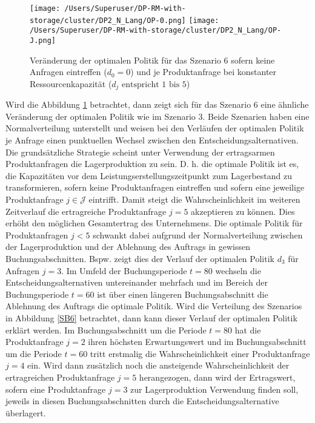 \begin{figure}[h!]     
\begin{center}
\texttt{[image: /Users/Superuser/DP-RM-with-storage/cluster/DP2\_N\_Lang/OP-0.png]}
\texttt{[image: /Users/Superuser/DP-RM-with-storage/cluster/DP2\_N\_Lang/OP-J.png]}
    \caption{Veränderung der optimalen Politik für das Szenario 6 sofern keine Anfragen eintreffen ($d_0=0$) und je Produktanfrage bei konstanter Ressourcenkapazität ($d_j\text{ entspricht }1\text{ bis }5$)}  \label{SV6}
  \end{center}
\end{figure}

Wird die Abbildung \ref{SV6} betrachtet, dann zeigt sich für das Szenario 6 eine ähnliche Veränderung der optimalen Politik wie im Szenario 3. Beide Szenarien haben eine Normalverteilung unterstellt und weisen bei den Verläufen der optimalen Politik je Anfrage einen punktuellen Wechsel zwischen den Entscheidungsalternativen. Die grundsätzliche Strategie scheint unter Verwendung der ertragsarmen Produktanfragen die \glqq Lagerproduktion{\grqq} zu sein. D. h. die optimale Politik ist es, die Kapazitäten vor dem Leistungserstellungszeitpunkt zum Lagerbestand zu transformieren, sofern keine Produktanfragen eintreffen und sofern eine jeweilige Produktanfrage $j\in\mathcal{J}$ eintrifft. Damit steigt die Wahrscheinlichkeit im weiteren Zeitverlauf die ertragreiche Produktanfrage $j=5$ akzeptieren zu können. Dies erhöht den möglichen Gesamtertrag des Unternehmens. Die optimale Politik für Produktanfragen $j<5$ schwankt dabei aufgrund der Normalverteilung zwischen der \glqq Lagerproduktion{\grqq} und der \glqq Ablehnung des Auftrags{\grqq} in gewissen Buchungsabschnitten. Bspw. zeigt dies der Verlauf der optimalen Politik $d_3$ für Anfragen $j=3$. Im Umfeld der Buchungsperiode $t=80$ wechseln die Entscheidungsalternativen untereinander mehrfach und im Bereich der Buchungsperiode $t=60$ ist über einen längeren Buchungsabschnitt die \glqq Ablehnung des Auftrags{\grqq} die optimale Politik. Wird die Verteilung des Szenarios in Abbildung \ref{SB6} betrachtet, dann kann dieser Verlauf der optimalen Politik erklärt werden. Im Buchungsabschnitt um die Periode $t=80$ hat die Produktanfrage $j=2$ ihren höchsten Erwartungswert und im Buchungsabschnitt um die Periode $t=60$ tritt erstmalig die Wahrscheinlichkeit einer Produktanfrage $j=4$ ein. Wird dann zusätzlich noch die ansteigende Wahrscheinlichkeit der ertragreichen Produktanfrage $j=5$ herangezogen, dann wird der Ertragswert, sofern eine Produktanfrage $j=3$ zur Lagerproduktion Verwendung finden soll, jeweils in diesen Buchungsabschnitten durch die Entscheidungsalternative überlagert.\\[.5cm]

